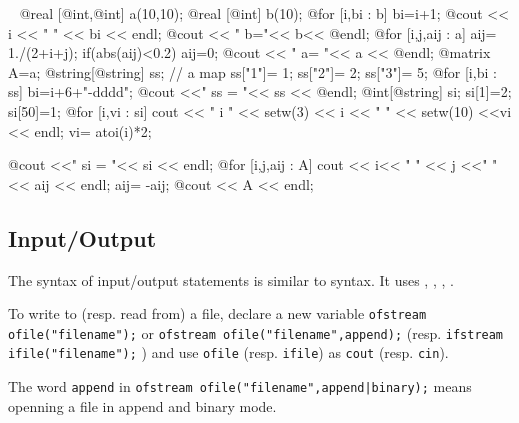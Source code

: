 \documentclass[a4paper,twoside,12pt]{book}
\def\setS#1{#1\label{sec:#1}}
\begin{document}
 \begin{example}~
\bFF
@real [@int,@int] a(10,10);
@real [@int] b(10);
@for [i,bi : b] {bi=i+1; @cout << i << " " << bi << endl;}
@cout << " b="<< b<< @endl;  
@for [i,j,aij : a] 
{
   aij= 1./(2+i+j);
   if(abs(aij)<0.2) aij=0;
}
@cout << " a= "<< a << @endl; 
@matrix A=a;
@string[@string] ss; // a map
ss["1"]= 1;
ss["2"]= 2;
ss["3"]= 5;
@for [i,bi : ss] 
    bi=i+6+"-dddd"; 
@cout <<" ss = "<< ss << @endl;
@int[@string] si;
si[1]=2;
si[50]=1;
@for [i,vi : si]
   {
   cout << " i " << setw(3) << i << " " << setw(10) <<vi << endl;
    vi= atoi(i)*2;
    }

@cout <<" si = "<< si << endl;
@for [i,j,aij : A]
{
    cout << i<< " " << j <<" " <<  aij << endl; 
    aij= -aij;
}
@cout << A << endl; 
\eFF
\end{example}



\subsection{\setS{Input/Output}}

The syntax of input/output statements is similar  to \Cpp syntax. It
uses , , , \ttCC{<<,>>}.

To write  to (resp. read from)  a file, \index{$<<$} \index{$>>$}
declare a new variable \texttt{ofstream ofile("filename");} or \texttt{ofstream ofile("filename",append);} (resp.
\texttt{ifstream ifile("filename");} ) and use \texttt{ofile}  (resp. \texttt{ifile})
as \texttt{cout} (resp. \texttt{cin}).

The word \texttt{append} in  \texttt{ofstream ofile("filename",append|binary);}
 means openning a file in append and binary mode.
\end{document}
